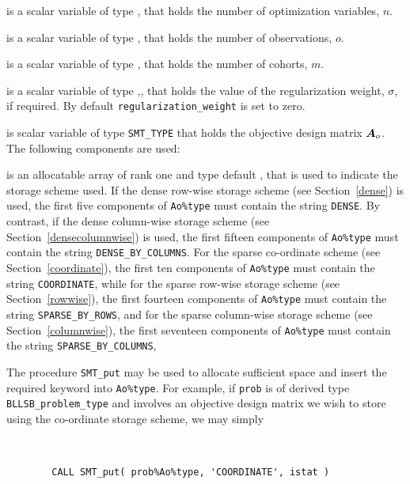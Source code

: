 \documentclass{galahad}
\newcommand{\packagename}{BLLSB}
\begin{document}
\begin{description}

 is a scalar variable of type \integer,
 that holds the number of optimization variables, $n$.

 is a scalar variable of type \integer,
 that holds the number of observations, $o$.

 is a scalar variable of type \integer,
 that holds the number of cohorts, $m$.

 is a scalar variable of type \realdp,,
 that holds the value of the regularization weight, $\sigma$, if required.
 By default {\tt regularization\_weight} is set to zero.

 is scalar variable of type {\tt SMT\_TYPE}
that holds the objective design matrix ${\bm{A}}_o$.
The following components are used:

\begin{description}

 is an allocatable array of rank one and type default \character,
that is used to indicate the storage scheme used.
If the dense row-wise storage scheme (see Section~\ref{dense}) is used,
the first five components of {\tt Ao\%type} must contain the
string {\tt DENSE}.
By contrast, if the dense column-wise storage scheme
(see Section~\ref{densecolumnwise}) is used,
the first fifteen components of {\tt Ao\%type} must contain the
string {\tt DENSE\_BY\_COLUMNS}.
For the sparse co-ordinate scheme (see Section~\ref{coordinate}),
the first ten components of {\tt Ao\%type} must contain the
string {\tt COORDINATE}, while
for the sparse row-wise storage scheme (see Section~\ref{rowwise}),
the first fourteen components of {\tt Ao\%type} must contain the
string {\tt SPARSE\_BY\_ROWS},
and for the sparse column-wise storage scheme (see Section~\ref{columnwise}),
the first seventeen components of {\tt Ao\%type} must contain the
string {\tt SPARSE\_BY\_COLUMNS},

The procedure {\tt SMT\_put} may be used to allocate sufficient space and
insert the required keyword into {\tt Ao\%type}. For example,
if {\tt prob} is of derived type {\tt \packagename\_problem\_type}
and involves an objective design matrix we wish to store using the co-ordinate
storage scheme, we may simply
{\tt
\begin{verbatim}
        CALL SMT_put( prob%Ao%type, 'COORDINATE', istat )
\end{verbatim}
}
\noindent


\end{description}
\end{description}
\end{document}
